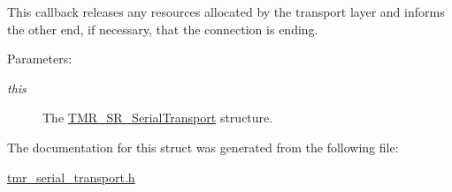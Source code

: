 This callback releases any resources allocated by the transport layer and informs the other end, if necessary, that the connection is ending.

\begin{Desc}
\item[Parameters:]
\begin{description}
\item[{\em this}]The \hyperlink{struct_t_m_r___s_r___serial_transport}{TMR\_\-SR\_\-SerialTransport} structure. \end{description}
\end{Desc}


The documentation for this struct was generated from the following file:\begin{CompactItemize}
\item 
\hyperlink{tmr__serial__transport_8h}{tmr\_\-serial\_\-transport.h}\end{CompactItemize}
